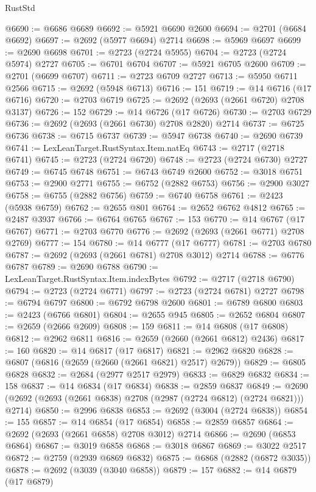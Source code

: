 \begin{lexlean}{RustStd}
\begin{coremodule}
@6690 := @6686 @6689
@6692 := @5921 @6690 @2600
@6694 := @2701 (@6684 @6692)
@6697 := @2692 (@5977 @6694) @2714
@6698 := @5969 @6697
@6699 := @2690 @6698
@6701 := @2723 (@2724 @5955)
@6704 := @2723 (@2724 @5974) @2727
@6705 := @6701 @6704
@6707 := @5921 @6705 @2600
@6709 := @2701 (@6699 @6707)
@6711 := @2723 @6709 @2727
@6713 := @5950 @6711 @2566
@6715 := @2692 (@5948 @6713)
@6716 := 151
@6719 := @14 @6716 (@17 @6716)
@6720 := @2703 @6719
@6725 := @2692 (@2693 (@2661 @6720) @2708 @3137)
@6726 := 152
@6729 := @14 @6726 (@17 @6726)
@6730 := @2703 @6729
@6736 := @2692 (@2693 (@2661 @6730) @2708 @2820) @2714
@6737 := @6725 @6736
@6738 := @6715 @6737
@6739 := @5947 @6738
@6740 := @2690 @6739
@6741 := LexLeanTarget.RustSyntax.Item.natEq
@6743 := @2717 (@2718 @6741)
@6745 := @2723 (@2724 @6720)
@6748 := @2723 (@2724 @6730) @2727
@6749 := @6745 @6748
@6751 := @6743 @6749 @2600
@6752 := @3018 @6751
@6753 := @2900 @2771
@6755 := @6752 (@2882 @6753)
@6756 := @2900 @3027
@6758 := @6755 (@2882 @6756)
@6759 := @6740 @6758
@6761 := @2423 (@5938 @6759)
@6762 := @2655 @801
@6764 := @2652 @6762 @4812
@6765 := @2487 @3937
@6766 := @6764 @6765
@6767 := 153
@6770 := @14 @6767 (@17 @6767)
@6771 := @2703 @6770
@6776 := @2692 (@2693 (@2661 @6771) @2708 @2769)
@6777 := 154
@6780 := @14 @6777 (@17 @6777)
@6781 := @2703 @6780
@6787 := @2692 (@2693 (@2661 @6781) @2708 @3012) @2714
@6788 := @6776 @6787
@6789 := @2690 @6788
@6790 := LexLeanTarget.RustSyntax.Item.indexBytes
@6792 := @2717 (@2718 @6790)
@6794 := @2723 (@2724 @6771)
@6797 := @2723 (@2724 @6781) @2727
@6798 := @6794 @6797
@6800 := @6792 @6798 @2600
@6801 := @6789 @6800
@6803 := @2423 (@6766 @6801)
@6804 := @2655 @945
@6805 := @2652 @6804
@6807 := @2659 (@2666 @2609)
@6808 := 159
@6811 := @14 @6808 (@17 @6808)
@6812 := @2962 @6811
@6816 := @2659 (@2660 (@2661 @6812) @2436)
@6817 := 160
@6820 := @14 @6817 (@17 @6817)
@6821 := @2962 @6820
@6828 := @6807 (@6816 (@2659 (@2660 (@2661 @6821) @2517) @2679))
@6829 := @6805 @6828
@6832 := @2684 (@2977 @2517 @2979)
@6833 := @6829 @6832
@6834 := 158
@6837 := @14 @6834 (@17 @6834)
@6838 := @2859 @6837
@6849 := @2690 (@2692 (@2693 (@2661 @6838) @2708 (@2987 (@2724 @6812) (@2724 @6821))) @2714)
@6850 := @2996 @6838
@6853 := @2692 (@3004 (@2724 @6838))
@6854 := 155
@6857 := @14 @6854 (@17 @6854)
@6858 := @2859 @6857
@6864 := @2692 (@2693 (@2661 @6858) @2708 @3012) @2714
@6866 := @2690 (@6853 @6864)
@6867 := @3019 @6858
@6868 := @3018 @6867
@6869 := @3022 @2517
@6872 := @2759 (@2939 @6869 @6832)
@6875 := @6868 (@2882 (@6872 @3035))
@6878 := @2692 (@3039 (@3040 @6858))
@6879 := 157
@6882 := @14 @6879 (@17 @6879)

\end{coremodule}
\end{lexlean}
